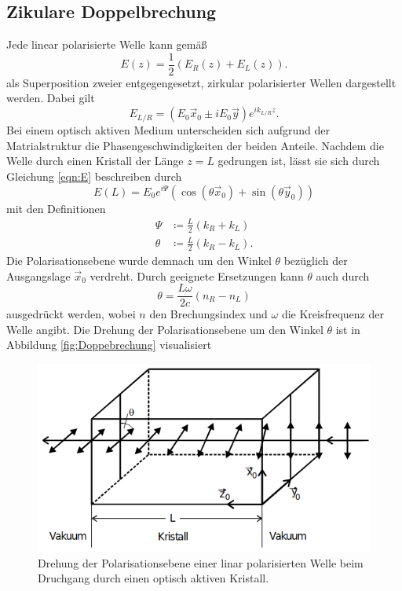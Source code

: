 \subsection{Zikulare Doppelbrechung}
Jede linear polarisierte Welle kann gemäß
\begin{equation}
    E(z)=\frac{1}{2}(E_R(z)+E_L(z)) . 
    \label{eqn:E}   
\end{equation}
als Superposition zweier entgegengesetzt, zirkular polarisierter Wellen dargestellt werden. Dabei gilt 
\begin{equation*}
    E_{L/R}=(E_0\vec{x}_0\pm iE_0\vec{y})e^{ik_{L/R}z} .
\end{equation*}
Bei einem optisch aktiven Medium unterscheiden sich aufgrund der Matrialstruktur die Phasengeschwindigkeiten der beiden Anteile. 
Nachdem die Welle durch einen Kristall der Länge $z=L$ gedrungen ist, lässt sie sich durch Gleichung \ref{eqn:E} beschreiben durch
\begin{equation*}
    E(L)=E_0e^{i\Psi}(\cos{(\theta\vec{x}_0)}+\sin{(\theta\vec{y}_0)})
\end{equation*}
mit den Definitionen
\begin{align*}
    \Psi  &\coloneqq \frac{L}{2}(k_R+k_L)\\
    \theta&\coloneqq \frac{L}{2}(k_R-k_L) .
\end{align*}
Die Polarisationsebene wurde demnach um den Winkel $\theta$ bezüglich der Ausgangslage $\vec{x}_0$ verdreht. Durch geeignete 
Ersetzungen kann $\theta$ auch durch 
\begin{equation*}
    \theta=\frac{L\omega}{2c}(n_R-n_L)
\end{equation*}
ausgedrückt werden, wobei $n$ den Brechungsindex und $\omega$ die Kreisfrequenz der Welle angibt. Die Drehung der Polarisationsebene
um den Winkel $\theta$ ist in Abbildung \ref{fig:Doppebrechung} visualisiert
\begin{figure}[H]
    \centering
    \includegraphics[scale=0.5]{pictures/Doppelbrechung.png}
    \caption{Drehung der Polarisationsebene einer linar polarisierten Welle beim Druchgang durch einen optisch aktiven Kristall.}
\end{figure}
